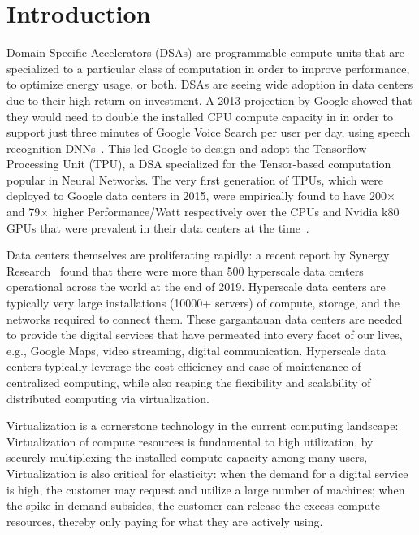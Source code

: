 \chapter{Introduction}
\label{sec:intro}

Domain Specific Accelerators (DSAs) are programmable compute units that are
specialized to a particular class of computation in order to improve
performance, to optimize energy usage, or both. DSAs are seeing wide adoption
in data centers due to their high return on investment.
A 2013 projection by Google showed that they would need to double the installed
CPU compute capacity in in order to support just three minutes of Google Voice
Search per user per day, using speech recognition DNNs~\cite{TPU-CACM}. This
led Google to design and adopt the Tensorflow Processing Unit (TPU), a DSA
specialized for the Tensor-based computation popular in Neural Networks. The
very first generation of TPUs, which were deployed to Google data centers in
2015, were empirically found to have 200$\times$ and 79$\times$ higher
Performance/Watt respectively over the CPUs and Nvidia k80 GPUs that were
prevalent in their data centers at the time~\cite{TPU-ISCA}.

Data centers themselves are proliferating rapidly: a recent report by
Synergy Research~\cite{datacentergrowth-src} found that there were more than
500 hyperscale data centers operational across the world at the end of 2019.
Hyperscale data centers are typically very large installations (10000+ servers)
of compute, storage, and the networks required to connect them. These
gargantauan data centers are needed to provide the digital services that have
permeated into every facet of our lives, e.g., Google Maps, video streaming,
digital communication.
Hyperscale data centers typically leverage the cost efficiency and ease of
maintenance of centralized computing, while also reaping the flexibility and
scalability of distributed computing via virtualization.

Virtualization is a cornerstone technology in the current computing landscape:
Virtualization of compute resources is fundamental to high utilization, by
securely multiplexing the installed compute capacity among many users,
Virtualization is also critical for elasticity: when the demand for a digital
service is high, the customer may request and utilize a large number of
machines; when the spike in demand subsides, the customer can release the
excess compute resources, thereby only paying for what they are actively using.

